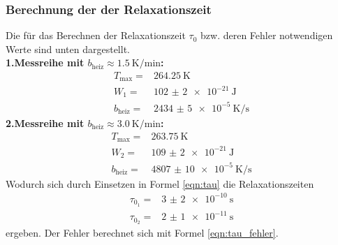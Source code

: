 \subsubsection{Berechnung der der Relaxationszeit}
Die für das Berechnen der Relaxationszeit $\tau_0$ bzw. deren Fehler
notwendigen Werte sind unten dargestellt.\\
\textbf{1.Messreihe mit $b_\text{heiz} \approx \SI{1.5}{\kelvin\per\minute}$:}
\begin{align*}
  T_\text{max} =& \SI{264.25}{\kelvin} \\
  W_1 =& \SI{102(2)e-21}{\joule} \\
  b_\text{heiz} =& \SI{2434(5)e-5}{\kelvin\per\second}
\end{align*}
\textbf{2.Messreihe mit $b_\text{heiz} \approx \SI{3.0}{\kelvin\per\minute}$:}
\begin{align*}
  T_\text{max} =& \SI{263.75}{\kelvin} \\
  W_2 =& \SI{109(2)e-21}{\joule} \\
  b_\text{heiz} =& \SI{4807(10)e-5}{\kelvin\per\second}
\end{align*}
Wodurch sich durch Einsetzen in Formel \ref{eqn:tau} die Relaxationszeiten
\begin{align*}
  \tau_{0_1} =& \SI{3(2)e-10}{\second} \\
  \tau_{0_2} =& \SI{2(1)e-11}{\second}
\end{align*}
ergeben. Der Fehler berechnet sich mit Formel \ref{eqn:tau_fehler}.
